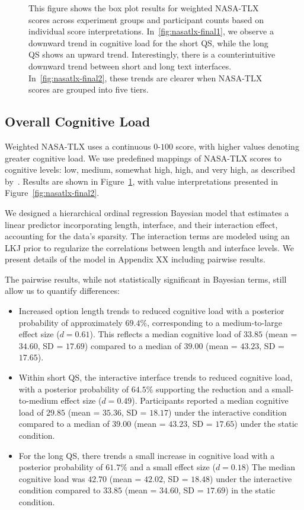 \begin{figure}[htbp]
    \caption{This figure shows the box plot results for weighted NASA-TLX scores across experiment groups and participant counts based on individual score interpretations. In~\ref{fig:nasatlx-final1}, we observe a downward trend in cognitive load for the short QS, while the long QS shows an upward trend. Interestingly, there is a counterintuitive downward trend between short and long text interfaces. In~\ref{fig:nasatlx-final2}, these trends are clearer when NASA-TLX scores are grouped into five tiers.}
    \label{fig:nasatlx-final}
\end{figure}

\subsection{Overall Cognitive Load}
\label{sec:cog}
Weighted NASA-TLX uses a continuous $0$-$100$ score, with higher values denoting greater cognitive load. We use predefined mappings of NASA-TLX scores to cognitive levels: low, medium, somewhat high, high, and very high, as described by~\textcite{hart1988development}. Results are shown in Figure~\ref{fig:nasatlx-final}, with value interpretations presented in Figure~\ref{fig:nasatlx-final2}.

We designed a hierarchical ordinal regression Bayesian model that estimates a linear predictor incorporating length, interface, and their interaction effect, accounting for the data's sparsity. The interaction terms are modeled using an LKJ prior to regularize the correlations between length and interface levels. We present details of the model in Appendix XX including pairwise results.

The pairwise results, while not statistically significant in Bayesian terms, still allow us to quantify differences:
\begin{itemize}
    \item Increased option length trends to reduced cognitive load with a posterior probability of approximately $69.4\%$, corresponding to a medium-to-large effect size ($d = 0.61$). This reflects a median cognitive load of $33.85$ (mean = $34.60$, SD = $17.69$) compared to a median of $39.00$ (mean = $43.23$, SD = $17.65$).
    \item Within short QS, the interactive interface trends to reduced cognitive load, with a posterior probability of $64.5\%$ supporting the reduction and a small-to-medium effect size ($d = 0.49$). Participants reported a median cognitive load of $29.85$ (mean = $35.36$, SD = $18.17$) under the interactive condition compared to a median of $39.00$ (mean = $43.23$, SD = $17.65$) under the static condition.
    \item For the long QS, there trends a small increase in cognitive load with a posterior probability of $61.7\%$ and a small effect size ($d = 0.18$) The median cognitive load was $42.70$ (mean = $42.02$, SD = $18.48$) under the interactive condition compared to $33.85$ (mean = $34.60$, SD = $17.69$) in the static condition.
\end{itemize}

